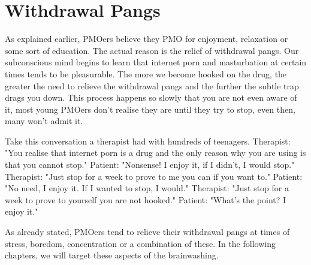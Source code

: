 \documentclass[easypeasy.tex]{subfiles}
\begin{document}
\section{Withdrawal Pangs}

As explained earlier, PMOers believe they PMO for enjoyment, relaxation or some sort of 
education. The actual reason is the relief of withdrawal pangs. Our subconscious mind begins to learn that internet porn and masturbation at certain times tends to be pleasurable. The more we become hooked on the drug, the greater the need to relieve the withdrawal pangs and the further the subtle trap drags you down. This process happens so slowly that you are not even aware of it, most young PMOers don't realise they are until they try to stop, even then, many won't admit it.

Take this conversation a therapist had with hundreds of teenagers.
  Therapist: "You realise that internet porn is a drug and the only reason why you are using is that you cannot stop."
  Patient: "Nonsense! I enjoy it, if I didn't, I would stop."
  Therapist: "Just stop for a week to prove to me you can if you want to."
  Patient: "No need, I enjoy it. If I wanted to stop, I would."
  Therapist: "Just stop for a week to prove to yourself you are not hooked."
  Patient: "What's the point? I enjoy it."

As already stated, PMOers tend to relieve their withdrawal pangs at times of stress, boredom, concentration or a combination of these. In the following chapters, we will target these aspects of the brainwashing.
\end{document}
